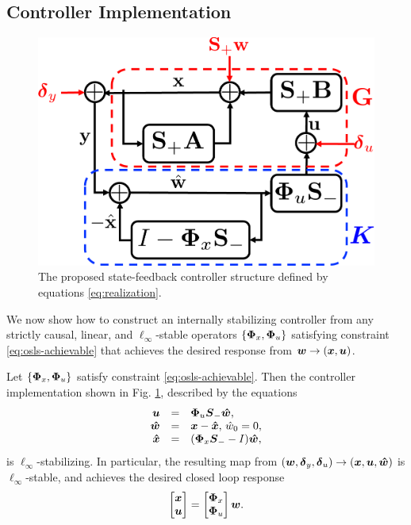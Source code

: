 \subsection{Controller Implementation}
\begin{figure}
\centering
\includegraphics[width=.325\textwidth]{interconnect}
\caption{The proposed state-feedback controller structure defined by equations \eqref{eq:realization}.}
\label{fig:realization}
\end{figure}
We now show how to construct an internally stabilizing controller from any strictly causal, linear, and $\ell_\infty$-stable operators $\left \{\boldsymbol{\Phi}_x,\boldsymbol{\Phi}_u\right\}$ satisfying constraint \eqref{eq:osls-achievable} that achieves the desired response from $\boldsymbol{w} \to (\boldsymbol{x}, \boldsymbol{u})$.
\begin{proposition}\label{prop:sufficiency}
Let $\left\{\boldsymbol{\Phi}_x,\boldsymbol{\Phi}_u\right\}$ satisfy constraint \eqref{eq:osls-achievable}.  Then the controller implementation shown in Fig. \ref{fig:realization}, described by the equations
\begin{equation}
\begin{array}{rcl}
\boldsymbol{u} &=& \boldsymbol{\Phi}_u \boldsymbol{S}_- \boldsymbol{\hat w},\\
 \boldsymbol{\hat w}  &=&  \boldsymbol{x} - \boldsymbol{\hat x}, \, \hat{w}_0 = 0, \\
\boldsymbol{\hat x} &=& (\boldsymbol{\Phi}_x\boldsymbol{S}_--I)\boldsymbol{\hat w},
\end{array}
\label{eq:realization}
\end{equation}
is $\ell_\infty$-stabilizing.  In particular, the resulting map from $(\boldsymbol{w}, \boldsymbol{\delta}_y, \boldsymbol{\delta}_u) \to (\boldsymbol{x}, \boldsymbol{u}, \boldsymbol{\hat w})$ is $\ell_\infty$-stable, and achieves the desired closed loop response
\begin{equation}
\begin{bmatrix} \boldsymbol{x} \\ \boldsymbol{u} \end{bmatrix} = \begin{bmatrix} \boldsymbol{\Phi}_x \\ \boldsymbol{\Phi}_u \end{bmatrix}\boldsymbol{w}.
\label{eq:response}
\end{equation}
\end{proposition}
